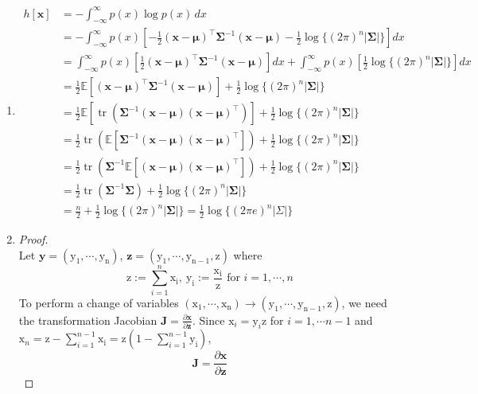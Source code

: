 \documentclass[11pt]{article}
\begin{document}
\begin{enumerate}
\item
    \begin{align*}
    h[\mathbf{x}] &= -\int_{-\infty}^{\infty}p(x)\log p(x)\,dx \\
    &= -\int_{-\infty}^{\infty}p(x)\left[-\frac{1}{2}(\bm x-\bm\mu)^{\top}\bm\Sigma^{-1}(\bm x-\bm\mu)-\frac{1}{2}\log\{(2\pi)^{n}|\bm\Sigma|\}\right]dx \\
    &= \int_{-\infty}^{\infty}p(x)\left[\frac{1}{2}(\bm x-\bm\mu)^{\top}\bm\Sigma^{-1}(\bm x-\bm\mu)\right]dx+\int_{-\infty}^{\infty}p(x)\left[\frac{1}{2}\log\{(2\pi)^{n}|\bm\Sigma|\}\right]dx \\
    &= \frac{1}{2}\mathbb{E}\left[(\bm x-\bm\mu)^{\top}\bm\Sigma^{-1}(\bm x-\bm\mu)\right]+\frac{1}{2}\log\{(2\pi)^{n}|\bm\Sigma|\} \\
    &= \frac{1}{2}\mathbb{E}\left[\operatorname{tr}\!\left(\bm\Sigma^{-1}(\bm x-\bm\mu)(\bm x-\bm\mu)^{\top}\right)\right]+\frac{1}{2}\log\{(2\pi)^{n}|\bm\Sigma|\} \\
    &= \frac{1}{2}\operatorname{tr}\left(\mathbb{E}\left[\bm\Sigma^{-1}(\bm x-\bm\mu)(\bm x-\bm\mu)^{\top}\right]\right)+\frac{1}{2}\log\{(2\pi)^{n}|\bm\Sigma|\} \\
    &= \frac{1}{2}\operatorname{tr}\left(\bm\Sigma^{-1}\mathbb{E}\left[(\bm x-\bm\mu)(\bm x-\bm\mu)^{\top}\right]\right)+\frac{1}{2}\log\{(2\pi)^{n}|\bm\Sigma|\} \\
    &= \frac{1}{2}\operatorname{tr}\left(\bm\Sigma^{-1}\bm\Sigma\right)+\frac{1}{2}\log\{(2\pi)^{n}|\bm\Sigma|\} \\
    &= \frac{n}{2}+\frac{1}{2}\log\{(2\pi)^{n}|\bm\Sigma|\}
    = \frac{1}{2}\log\{(2\pi e)^{n}|\Sigma|\}
    \end{align*}
\item
    \begin{proof}$ $\\
    Let $\mathbf{y}=(\mathrm{y_{1}},\cdots,\mathrm{y_{n}})$, $\mathbf{z}=(\mathrm{y_{1}},\cdots,\mathrm{y_{n-1}},\mathrm{z})$ where
    \[\mathrm{z}:=\sum_{i=1}^{n}\mathrm{x_{i}},\ \mathrm{y_{i}}:=\frac{\mathrm{x_{i}}}{\mathrm{z}}\text{ for } i=1,\cdots,n\]
    To perform a change of variables $(\mathrm{x_{1}},\cdots,\mathrm{x_{n}})\to(\mathrm{y_{1}},\cdots,\mathrm{y_{n-1}},\mathrm{z})$, we need the transformation Jacobian $\bm J=\frac{\partial\mathbf{x}}{\partial\mathbf{z}}$. Since $\mathrm{x}_{i}=\mathrm{y}_{i}\mathrm{z}$ for $i=1,\cdots n-1$ and $\mathrm{x}_{n}=\mathrm{z}-\sum_{i=1}^{n-1}\mathrm{x_{i}}=\mathrm{z}\left(1-\sum_{i=1}^{n-1}\mathrm{y_{i}}\right)$,
    \[\bm J=\frac{\partial\mathbf{x}}{\partial\mathbf{z}}
\]
\end{proof}
\end{enumerate}
\end{document}
